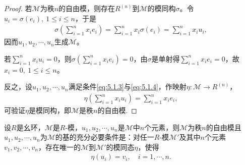 \documentclass[../../main.tex]{subfiles}%
\begin{document}
\begin{proof}
若$\mathscr{M}$为秩$n$的自由模，则存在$R^{(n)}$到$\mathscr{M}$的模同构$\sigma$。令$u_i=\sigma(e_i),\ 1\leqslant i\leqslant n$，于是
\begin{align*}
\sigma\left(\sum\limits_{i=1}^n x_i e_i\right)=\sum\limits_{i=1}^n x_i \sigma(e_i)=\sum\limits_{i=1}^n x_i u_i,
\end{align*}
因而$u_1,u_2,\cdots,u_n$生成$\mathscr{M}$。

若$\sum\limits_{i=1}^n x_i u_i=0$，则$\sigma\left(\sum\limits_{i=1}^n x_i e_i\right)=0$，由$\sigma$是单射得$\sum\limits_{i=1}^n x_i e_i=0$，故$x_i=0,\ 1\leqslant i\leqslant n$。

反之，设$u_1,u_2,\cdots,u_n$满足条件\eqref{eq:5.1.3}与\eqref{eq:5.1.4}，作映射$\eta:\mathscr{M}\to R^{(n)}$，
\begin{align*}
\eta\left(\sum\limits_{i=1}^n x_i u_i\right)=\sum\limits_{i=1}^n x_i e_i,
\end{align*}
可验证$\eta$是模同构，即$\mathscr{M}$是秩$n$的自由模.
\end{proof}

\begin{theorem}
设$R$是幺环，$\mathscr{M}$是$R$-模，$u_1,u_2,\cdots,u_n$是$\mathscr{M}$中$n$个元素，则$\mathscr{M}$为秩$n$的自由模且$u_1,u_2,\cdots,u_n$为$\mathscr{M}$的基的充分必要条件是：对任一$R$-模$\mathscr{M}'$及其中$n$个元素$v_1,v_2,\cdots,v_n$，存在唯一的$\mathscr{M}$到$\mathscr{M}'$的模同态$\eta$，使得
\begin{align*}
\eta(u_i)=v_i,\quad i=1,\cdots,n.
\end{align*}
\end{theorem}
\end{document}
